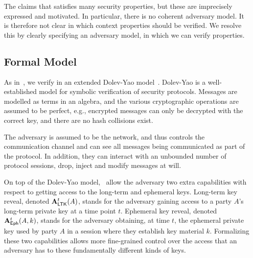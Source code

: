 The \mEdhoc{} \mSpec{} \cite{our-analysis-selander-lake-edhoc-00} claims
that \mEdhoc{} satisfies many security properties, but these are imprecisely
expressed and motivated.
%
In particular, there is no coherent adversary model.
%
It is therefore not clear in which context properties should be verified.
%
We resolve this by clearly specifying an adversary model, in which we can 
verify
properties.
%

\subsection{Formal Model}\label{sec:threat-model}
As in~\cite{Norr21}, we verify \mEdhoc{} in an extended
Dolev-Yao model~\cite{DY83}.
%
Dolev-Yao is a well-established model for symbolic verification of security
protocols.
%
Messages are modelled as terms in an algebra, and the various cryptographic
operations are assumed to be perfect, e.g., encrypted messages can only be
decrypted with the correct key, and there are no hash collisions exist.
%

The adversary is assumed to be the network, and thus controls the 
communication
channel and can see all messages being communicated as part of the protocol.
%
In addition, they can interact with an unbounded number of protocol sessions,
drop, inject and modify messages at will.
%

On top of the Dolev-Yao model,~\cite{Norr21} allow the adversary two extra
capabilities with respect to getting access to the long-term and ephemeral 
keys.
%
Long-term key reveal, denoted $\mathbf{A}_{\textsf{LTK}}^{t}(A)$, stands for the adversary
gaining access to a party $A$'s long-term private key  at a time point 
$t$.
%
Ephemeral key reveal, denoted $\mathbf{A}_{\textsf{Eph}}^{t}(A, k)$, stands for the adversary
obtaining, at time $t$, the ephemeral private key  used by party $A$
in a session where they establish key material $k$.
%
%
Formalizing these two capabilities allows more fine-grained control
over the access that an adversary has to these fundamentally different kinds of
keys.
%

